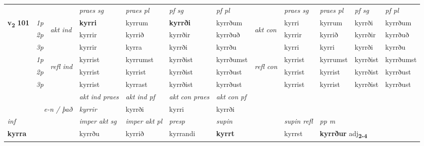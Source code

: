 \begin{longtable}[l]{X>{\footnotesize\itshape}llXXXXlXXXX}
 & &   & \textit{praes sg}  & \textit{praes pl}    & \textit{ pf sg} & \textit{pf pl} & & \textit{praes sg}  & \textit{praes pl}    & \textit{pf sg} & \textit{pf pl }  \\ \cmidrule{4-7} \cmidrule{9-12}
 \multirow{2}{*}{{{\textbf{v{\textsubscript{2}}} \Large{\textbf{101}}}}}  & 1p & \multirow{3}{*}{\begin{turn}{90}\textit{akt ind}\end{turn}} & \textbf{kyrri} & kyrrum & \textbf{kyrrði} & kyrrðum & \multirow{3}{*}{\begin{turn}{90}\textit{akt con}\end{turn}} &kyrri & kyrrum & kyrrði & kyrrðum\\*
 & 2p &  &  kyrrir  & kyrrið & kyrrðir & kyrrðuð & & kyrrir & kyrrið & kyrrðir & kyrrðuð \\*
 & 3p &  & kyrrir & kyrra & kyrrði & kyrrðu & & kyrri & kyrri& kyrrði & kyrrðu \\*
\cmidrule{4-7} \cmidrule{9-12}
 & 1p & \multirow{3}{*}{\begin{turn}{90}\textit{refl ind}\end{turn}}  & kyrrist & kyrrumst & kyrrðist & kyrrðumst & \multirow{3}{*}{\begin{turn}{90}\textit{refl con}\end{turn}}  &kyrrist & kyrrumst & kyrrðist & kyrrðumst \\*
 & 2p &  & kyrrist & kyrrist & kyrrðist & kyrrðust & &kyrrist & kyrrist & kyrrðist & kyrrðust \\*
 & 3p  & & kyrrist & kyrrast & kyrrðist & kyrrðust & & kyrrist & kyrrist& kyrrðist & kyrrðust \\*
\cmidrule{4-7} \cmidrule{9-12}

   && &  \textit{akt ind praes} & \textit{akt ind pf} & \textit{akt con praes} & \textit{akt con pf} \\*
\multicolumn{3}{r}{\textit{e-n / það}} & kyrrir & kyrrði & kyrri & kyrrði \\*

\cmidrule{4-7}
   {\textit{inf}} & &  & \textit{imper akt sg} & \textit{imper akt pl}   & \textit{presp} & \textit{supin} && \textit{supin refl} & \textit{pp m} \\*
  {\textbf{kyrra}} & && kyrrðu  & kyrrið   & kyrrandi &  \textbf{kyrrt} && kyrrst & \multicolumn{2}{l}{\textbf{kyrrður} adj\textbf{\textsubscript{2-4}}} \\*

\midrule


\end{longtable}
